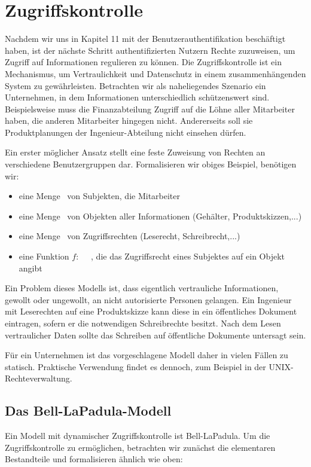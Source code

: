 \chapter{Zugriffskontrolle}
Nachdem wir uns in Kapitel 11 mit der Benutzerauthentifikation beschäftigt haben, ist der nächste Schritt authentifizierten Nutzern Rechte zuzuweisen, um Zugriff auf Informationen regulieren zu können. Die Zugriffskontrolle ist ein Mechanismus, um Vertraulichkeit und Datenschutz in einem zusammenhängenden System zu gewährleisten.
Betrachten wir als naheliegendes Szenario ein Unternehmen, in dem Informationen unterschiedlich schützenswert sind. Beispielsweise muss die Finanzabteilung Zugriff auf die Löhne aller Mitarbeiter haben, die anderen Mitarbeiter hingegen nicht. Andererseits soll sie Produktplanungen der Ingenieur-Abteilung nicht einsehen dürfen.

Ein erster möglicher Ansatz stellt eine feste Zuweisung von Rechten an verschiedene Benutzergruppen dar.
Formalisieren wir obiges Beispiel, benötigen wir:

\begin{itemize}
	\item eine Menge \calS\ von Subjekten, die Mitarbeiter
	\item eine Menge \calO\ von Objekten aller Informationen (Gehälter, Produktskizzen,...)
	\item eine Menge \calR\  von Zugriffsrechten (Leserecht, Schreibrecht,...)
	\item eine Funktion \(f:\) \calS \ctsProd \calO\ \rArrow\ \calR, die das Zugriffsrecht eines Subjektes auf ein Objekt angibt
\end{itemize}

Ein Problem dieses Modells ist, dass eigentlich vertrauliche Informationen, gewollt oder ungewollt, an nicht autorisierte Personen gelangen. Ein Ingenieur mit Leserechten auf eine Produktskizze kann diese in ein öffentliches Dokument eintragen, sofern er die notwendigen Schreibrechte besitzt. Nach dem Lesen vertraulicher Daten sollte das Schreiben auf öffentliche Dokumente untersagt sein.

Für ein Unternehmen ist das vorgeschlagene Modell daher in vielen Fällen zu statisch. Praktische Verwendung findet es dennoch, zum Beispiel in der UNIX-Rechteverwaltung.

\section{Das Bell-LaPadula-Modell}
Ein Modell mit dynamischer Zugriffskontrolle ist Bell-LaPadula. Um die Zugriffskontrolle zu ermöglichen, betrachten wir zunächst die elementaren Bestandteile und formalisieren ähnlich wie oben:

